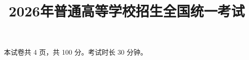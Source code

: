 \documentclass[class=exam-zh, crop]{standalone}
\title{2026年普通高等学校招生全国统一考试}
\begin{document}
\secret
\maketitle

本试卷共 4 页，共 100 分。考试时长 30 分钟。
\end{document}
